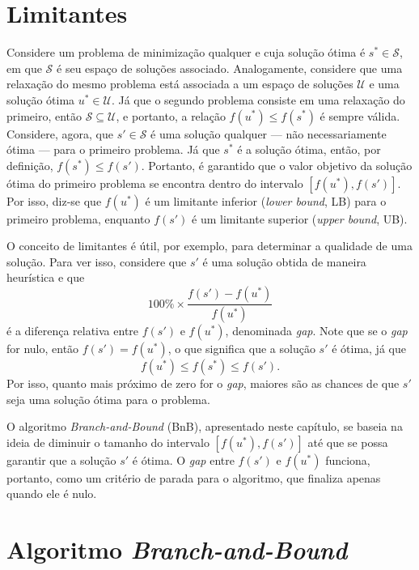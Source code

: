 {\section{Limitantes}
Considere um problema de minimização qualquer e cuja solução ótima é $s^* \in \mathcal{S}$, em que $\mathcal{S}$ é seu espaço de soluções associado. Analogamente, considere que uma relaxação do mesmo problema está associada a um espaço de soluções $\mathcal{U}$ e uma solução ótima $u^* \in \mathcal{U}$. Já que o segundo problema consiste em uma relaxação do primeiro, então $\mathcal{S} \subseteq \mathcal{U}$, e portanto, a relação $f(u^*) \leq f(s^*)$ é sempre válida. Considere, agora, que $s' \in \mathcal{S}$ é uma solução qualquer --- não necessariamente ótima --- para o primeiro problema.  Já que $s^*$ é a solução ótima, então, por definição, \(f(s^*) \leq f(s')\). Portanto, é garantido que o valor objetivo da solução ótima do primeiro problema se encontra dentro do intervalo $[f(u^*), f(s')]$. Por isso, diz-se que $f(u^*)$ é um limitante inferior (\textit{lower bound}, LB) para o primeiro problema, enquanto $f(s')$ é um limitante superior (\textit{upper bound}, UB).

O conceito de limitantes é útil, por exemplo, para determinar a qualidade de uma solução. Para ver isso, considere que $s'$ é uma solução obtida de maneira heurística e que \[100\% \times \frac{f(s') - f(u^*)}{f(u^*)} \] é a diferença relativa entre $f(s')$ e $f(u^*)$, denominada \textit{gap}. Note que se o \textit{gap} for nulo, então $f(s') = f(u^*)$, o que significa que a solução $s'$ é ótima, já que \[f(u^*) \leq f(s^*) \leq f(s').\] Por isso, quanto mais próximo de zero for o \textit{gap}, maiores são as chances de que $s'$ seja uma solução ótima para o problema. 

O algoritmo \textit{Branch-and-Bound} (BnB), apresentado neste capítulo, se baseia na ideia de diminuir o tamanho do intervalo $[f(u^*), f(s')]$ até que se possa garantir que a solução $s'$ é ótima. O \textit{gap} entre $f(s')$ e $f(u^*)$ funciona, portanto, como um critério de parada para o algoritmo, que finaliza apenas quando ele é nulo.

\section{Algoritmo \textit{Branch-and-Bound}}

}
